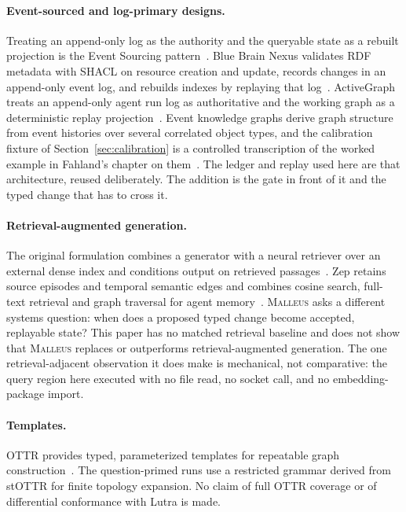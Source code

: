 \documentclass[10pt]{article}
\newcommand{\malleus}{\textsc{Malleus}}
\begin{document}
\paragraph{Event-sourced and log-primary designs.} Treating an append-only log as the authority and the queryable state as a rebuilt projection is the Event Sourcing pattern~\citep{fowler2005eventsourcing}. Blue Brain Nexus validates RDF metadata with SHACL on resource creation and update, records changes in an append-only event log, and rebuilds indexes by replaying that log~\citep{sy2023bluebrainnexus}. ActiveGraph treats an append-only agent run log as authoritative and the working graph as a deterministic replay projection~\citep{nakajima2026log}. Event knowledge graphs derive graph structure from event histories over several correlated object types, and the calibration fixture of Section~\ref{sec:calibration} is a controlled transcription of the worked example in Fahland's chapter on them~\citep{fahland2022ekg}. The ledger and replay used here are that architecture, reused deliberately. The addition is the gate in front of it and the typed change that has to cross it.

\paragraph{Retrieval-augmented generation.} The original formulation combines a generator with a neural retriever over an external dense index and conditions output on retrieved passages~\citep{lewis2020retrieval}. Zep retains source episodes and temporal semantic edges and combines cosine search, full-text retrieval and graph traversal for agent memory~\citep{rasmussen2025zep}. \malleus{} asks a different systems question: when does a proposed typed change become accepted, replayable state? This paper has no matched retrieval baseline and does not show that \malleus{} replaces or outperforms retrieval-augmented generation. The one retrieval-adjacent observation it does make is mechanical, not comparative: the query region here executed with no file read, no socket call, and no embedding-package import.

\paragraph{Templates.} OTTR provides typed, parameterized templates for repeatable graph construction~\citep{skjaeveland2024reasonable}. The question-primed runs use a restricted grammar derived from stOTTR for finite topology expansion. No claim of full OTTR coverage or of differential conformance with Lutra is made.
\end{document}
